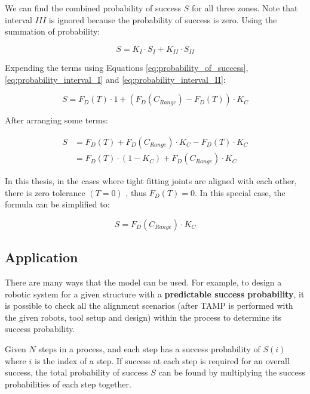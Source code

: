 

We can find the combined probability of success $S$ for all three zones. Note that interval $III$ is ignored because the probability of success is zero. Using the summation of probability:

\begin{equation} \label{eq:probability_of_three_intervals}
    S = K_I \cdot S_I + K_{II} \cdot S_{II}   
\end{equation}

Expending the terms using Equations \ref{eq:probability_of_success}, \ref{eq:probability_interval_I} and \ref{eq:probability_interval_II}:

\begin{equation} \label{eq:probability_expanded}
    S = F_D(T) \cdot 1 + (F_D (C_{Range}) - F_D(T)) \cdot K_C
\end{equation}

After arranging some terms:

\begin{align} \label{eq:probability_expanded_rearranged}
    S &= F_D(T) + F_D (C_{Range}) \cdot K_C - F_D(T) \cdot K_C \nonumber \\
      &= F_D(T) \cdot (1 - K_C) + F_D(C_{Range}) \cdot K_C 
\end{align}

In this thesis, in the cases where tight fitting joints are aligned with each other, there is zero tolerance $(T = 0)$ , thus $F_D(T) = 0$. In this special case, the formula can be simplified to:

\begin{equation} \label{eq:probability_when_zero_tolerance}
    S = F_D(C_{Range}) \cdot K_C 
\end{equation}

\subsection{Application}
\label{subsection:new_hypo_model_application}

There are many ways that the model can be used. For example, to design a robotic system for a given structure with a \textbf{predictable success probability}, it is possible to check all the alignment scenarios (after TAMP is performed with the given robots, tool setup and design) within the process to determine its success probability. 

Given $N$ steps in a process, and each step has a success probability of $S(i)$ where $i$ is the index of a step. If success at each step is required for an overall success, the total probability of success $S$ can be found by multiplying the success probabilities of each step together.

